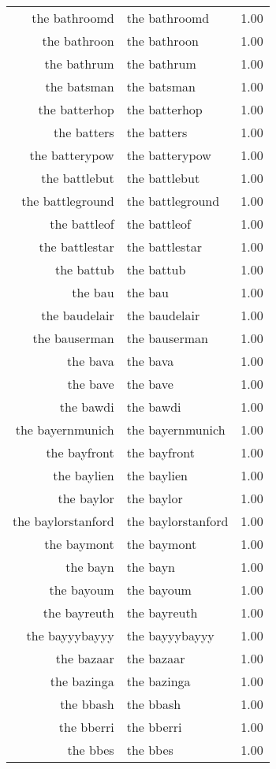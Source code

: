 \begin{table}[ht]
\begin{tabular}{rlr}
  the bathroomd & the bathroomd & 1.00 \\ 
  the bathroon & the bathroon & 1.00 \\ 
  the bathrum & the bathrum & 1.00 \\ 
  the batsman & the batsman & 1.00 \\ 
  the batterhop & the batterhop & 1.00 \\ 
  the batters & the batters & 1.00 \\ 
  the batterypow & the batterypow & 1.00 \\ 
  the battlebut & the battlebut & 1.00 \\ 
  the battleground & the battleground & 1.00 \\ 
  the battleof & the battleof & 1.00 \\ 
  the battlestar & the battlestar & 1.00 \\ 
  the battub & the battub & 1.00 \\ 
  the bau & the bau & 1.00 \\ 
  the baudelair & the baudelair & 1.00 \\ 
  the bauserman & the bauserman & 1.00 \\ 
  the bava & the bava & 1.00 \\ 
  the bave & the bave & 1.00 \\ 
  the bawdi & the bawdi & 1.00 \\ 
  the bayernmunich & the bayernmunich & 1.00 \\ 
  the bayfront & the bayfront & 1.00 \\ 
  the baylien & the baylien & 1.00 \\ 
  the baylor & the baylor & 1.00 \\ 
  the baylorstanford & the baylorstanford & 1.00 \\ 
  the baymont & the baymont & 1.00 \\ 
  the bayn & the bayn & 1.00 \\ 
  the bayoum & the bayoum & 1.00 \\ 
  the bayreuth & the bayreuth & 1.00 \\ 
  the bayyybayyy & the bayyybayyy & 1.00 \\ 
  the bazaar & the bazaar & 1.00 \\ 
  the bazinga & the bazinga & 1.00 \\ 
  the bbash & the bbash & 1.00 \\ 
  the bberri & the bberri & 1.00 \\ 
  the bbes & the bbes & 1.00 \\ 

\end{tabular}
\end{table}
